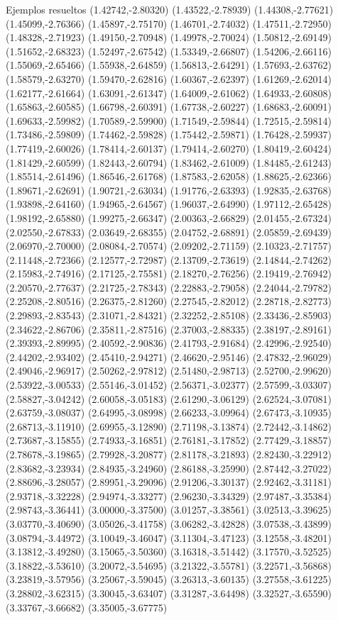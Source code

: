 \documentclass[11pt,a4paper]{article}
\begin{document}
\begin{fmex}{Ejemplos resueltos}
(1.42742,-2.80320) (1.43522,-2.78939) (1.44308,-2.77621) (1.45099,-2.76366) (1.45897,-2.75170) (1.46701,-2.74032) (1.47511,-2.72950) (1.48328,-2.71923) (1.49150,-2.70948) (1.49978,-2.70024) (1.50812,-2.69149) (1.51652,-2.68323) (1.52497,-2.67542) (1.53349,-2.66807) (1.54206,-2.66116) (1.55069,-2.65466) (1.55938,-2.64859) (1.56813,-2.64291) (1.57693,-2.63762) (1.58579,-2.63270) (1.59470,-2.62816) (1.60367,-2.62397) (1.61269,-2.62014) (1.62177,-2.61664) (1.63091,-2.61347) (1.64009,-2.61062) (1.64933,-2.60808) (1.65863,-2.60585) (1.66798,-2.60391) (1.67738,-2.60227) (1.68683,-2.60091) (1.69633,-2.59982) (1.70589,-2.59900) (1.71549,-2.59844) (1.72515,-2.59814) (1.73486,-2.59809) (1.74462,-2.59828) (1.75442,-2.59871) (1.76428,-2.59937) (1.77419,-2.60026) (1.78414,-2.60137) (1.79414,-2.60270) (1.80419,-2.60424) (1.81429,-2.60599) (1.82443,-2.60794) (1.83462,-2.61009) (1.84485,-2.61243) (1.85514,-2.61496) (1.86546,-2.61768) (1.87583,-2.62058) (1.88625,-2.62366) (1.89671,-2.62691) (1.90721,-2.63034) (1.91776,-2.63393) (1.92835,-2.63768) (1.93898,-2.64160) (1.94965,-2.64567) (1.96037,-2.64990) (1.97112,-2.65428) (1.98192,-2.65880) (1.99275,-2.66347) (2.00363,-2.66829) (2.01455,-2.67324) (2.02550,-2.67833) (2.03649,-2.68355) (2.04752,-2.68891) (2.05859,-2.69439) (2.06970,-2.70000) (2.08084,-2.70574) (2.09202,-2.71159) (2.10323,-2.71757) (2.11448,-2.72366) (2.12577,-2.72987) (2.13709,-2.73619) (2.14844,-2.74262) (2.15983,-2.74916) (2.17125,-2.75581) (2.18270,-2.76256) (2.19419,-2.76942) (2.20570,-2.77637) (2.21725,-2.78343) (2.22883,-2.79058) (2.24044,-2.79782) (2.25208,-2.80516) (2.26375,-2.81260) (2.27545,-2.82012) (2.28718,-2.82773) (2.29893,-2.83543) (2.31071,-2.84321) (2.32252,-2.85108) (2.33436,-2.85903) (2.34622,-2.86706) (2.35811,-2.87516) (2.37003,-2.88335) (2.38197,-2.89161) (2.39393,-2.89995) (2.40592,-2.90836) (2.41793,-2.91684) (2.42996,-2.92540) (2.44202,-2.93402) (2.45410,-2.94271) (2.46620,-2.95146) (2.47832,-2.96029) (2.49046,-2.96917) (2.50262,-2.97812) (2.51480,-2.98713) (2.52700,-2.99620) (2.53922,-3.00533) (2.55146,-3.01452) (2.56371,-3.02377) (2.57599,-3.03307) (2.58827,-3.04242) (2.60058,-3.05183) (2.61290,-3.06129) (2.62524,-3.07081) (2.63759,-3.08037) (2.64995,-3.08998) (2.66233,-3.09964) (2.67473,-3.10935) (2.68713,-3.11910) (2.69955,-3.12890) (2.71198,-3.13874) (2.72442,-3.14862) (2.73687,-3.15855) (2.74933,-3.16851) (2.76181,-3.17852) (2.77429,-3.18857) (2.78678,-3.19865) (2.79928,-3.20877) (2.81178,-3.21893) (2.82430,-3.22912) (2.83682,-3.23934) (2.84935,-3.24960) (2.86188,-3.25990) (2.87442,-3.27022) (2.88696,-3.28057) (2.89951,-3.29096) (2.91206,-3.30137) (2.92462,-3.31181) (2.93718,-3.32228) (2.94974,-3.33277) (2.96230,-3.34329) (2.97487,-3.35384) (2.98743,-3.36441) (3.00000,-3.37500) (3.01257,-3.38561) (3.02513,-3.39625) (3.03770,-3.40690) (3.05026,-3.41758) (3.06282,-3.42828) (3.07538,-3.43899) (3.08794,-3.44972) (3.10049,-3.46047) (3.11304,-3.47123) (3.12558,-3.48201) (3.13812,-3.49280) (3.15065,-3.50360) (3.16318,-3.51442) (3.17570,-3.52525) (3.18822,-3.53610) (3.20072,-3.54695) (3.21322,-3.55781) (3.22571,-3.56868) (3.23819,-3.57956) (3.25067,-3.59045) (3.26313,-3.60135) (3.27558,-3.61225) (3.28802,-3.62315) (3.30045,-3.63407) (3.31287,-3.64498) (3.32527,-3.65590) (3.33767,-3.66682) (3.35005,-3.67775) 
\end{fmex}
\end{document}
